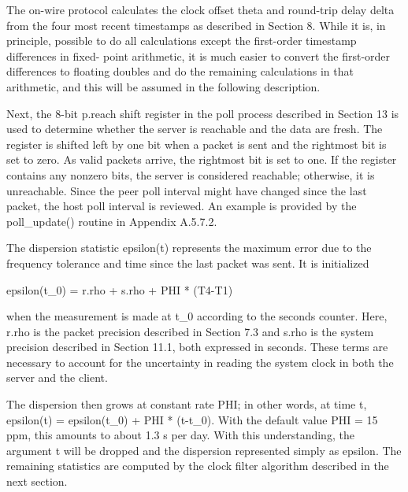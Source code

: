 The on-wire protocol calculates the clock offset theta and round-trip
delay delta from the four most recent timestamps as described in
Section 8. While it is, in principle, possible to do all
calculations except the first-order timestamp differences in fixed-
point arithmetic, it is much easier to convert the first-order
differences to floating doubles and do the remaining calculations in
that arithmetic, and this will be assumed in the following
description.

Next, the 8-bit p.reach shift register in the poll process described
in Section 13 is used to determine whether the server is reachable
and the data are fresh. The register is shifted left by one bit when
a packet is sent and the rightmost bit is set to zero. As valid
packets arrive, the rightmost bit is set to one. If the register
contains any nonzero bits, the server is considered reachable;
otherwise, it is unreachable. Since the peer poll interval might
have changed since the last packet, the host poll interval is
reviewed. An example is provided by the poll\_update() routine in
Appendix A.5.7.2.

The dispersion statistic epsilon(t) represents the maximum error due
to the frequency tolerance and time since the last packet was sent.
It is initialized

epsilon(t\_0) = r.rho + s.rho + PHI * (T4-T1)

when the measurement is made at t\_0 according to the seconds counter.
Here, r.rho is the packet precision described in Section 7.3 and
s.rho is the system precision described in Section 11.1, both
expressed in seconds. These terms are necessary to account for the
uncertainty in reading the system clock in both the server and the
client.

The dispersion then grows at constant rate PHI; in other words, at
time t, epsilon(t) = epsilon(t\_0) + PHI * (t-t\_0). With the default
value PHI = 15 ppm, this amounts to about 1.3 s per day. With this
understanding, the argument t will be dropped and the dispersion
represented simply as epsilon. The remaining statistics are computed
by the clock filter algorithm described in the next section.
